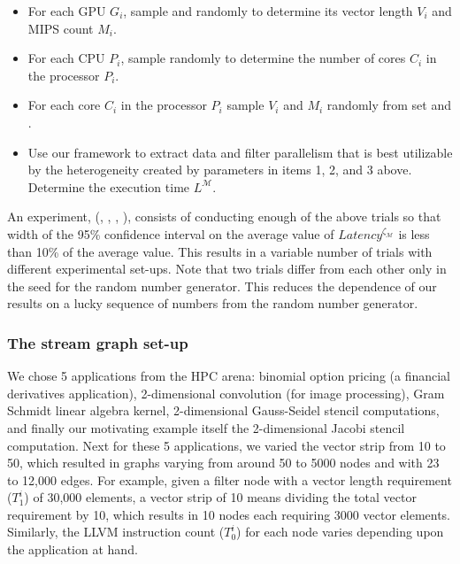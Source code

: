 \begin{itemize}

\item For each GPU $G_i$, sample \veclenset and \mipsset randomly to
  determine its vector length $V_i$ and MIPS count $M_i$. \label{i1}

\item For each CPU $P_i$, sample \corenumset randomly to determine the
  number of cores $C_i$ in the processor $P_i$.~\label{i2}

\item For each core $C_i$ in the processor $P_i$ sample $V_i$ and $M_i$
  randomly from set \veclenset and \mipsset.

\item Use our framework to extract data and filter parallelism that is
  best utilizable by the heterogeneity created by parameters in items 1,
  2, and 3 above. Determine the execution time
  $L^{\mathcal{M}}$.

\end{itemize}

An experiment, \expt(\numtplgynodes, \gpunum, \veclenset, \corenumset
\mipsset), consists of conducting enough of the above trials so that
width of the 95\% confidence interval on the average value of
$Latency^{\zeta_\mathcal{M}}$ is less than 10\% of the average
value. This results in a variable number of trials with different
experimental set-ups. Note that two trials differ from each other only in
the seed for the random number generator.  This reduces the dependence
of our results on a lucky sequence of numbers from the random number
generator.

\subsubsection{The stream graph set-up}
\label{sec:filter-graph-setup}

We chose 5 applications from the HPC arena: binomial option pricing (a
financial derivatives application), 2-dimensional convolution (for image
processing), Gram Schmidt linear algebra kernel, 2-dimensional
Gauss-Seidel stencil computations, and finally our motivating example
itself the 2-dimensional Jacobi stencil computation. Next for these 5
applications, we varied the vector strip from 10 to 50, which resulted
in graphs varying from around 50 to 5000 nodes and with 23 to 12,000
edges. For example, given a filter node with a vector length requirement
($T^i_1$) of 30,000 elements, a vector strip of 10 means dividing the
total vector requirement by 10, which results in 10 nodes each requiring
3000 vector elements. Similarly, the LLVM instruction count ($T^i_0$)
for each node varies depending upon the application at hand.

